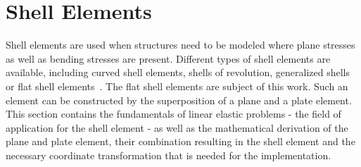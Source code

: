 \section{Shell Elements}\label{sec:Shell}
 Shell elements are used when structures need to be modeled where plane stresses as well as bending stresses are present. Different types of shell elements are available, including curved shell elements, shells of revolution, generalized shells or flat shell elements~\cite{cook2002concepts}. The flat shell elements are subject of this work. Such an element can be constructed by the superposition of a plane and a plate element. This section contains the fundamentals of linear elastic problems - the field of application for the shell element - as well as the mathematical derivation of the plane and plate element, their combination resulting in the shell element and the necessary coordinate transformation that is needed for the implementation. 
 
 
